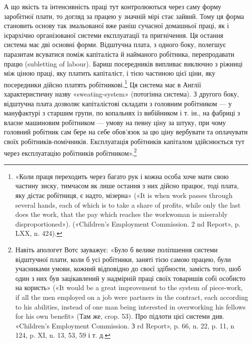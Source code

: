 А що якість та інтенсивність праці тут контролюються через
саму форму заробітної плати, то догляд за працею у значній мірі
стає зайвий. Тому ця форма становить основу так змальованої
вже раніш сучасної домашньої праці, як і ієрархічно організованої
системи експлуатації та пригнічення. Ця остання система
має дві основні форми. Відштучна плата, з одного боку, полегшує
паразитам всуватися поміж капіталіста й найманого робітника,
перепродавати працю (subletting of labour). Бариш посередників
випливає виключно з ріжниці між ціною праці, яку платить
капіталіст, і тією частиною цієї ціни, яку посередники дійсно
платять робітникові.\footnote{
«Коли праця переходить через багато рук і кожна особа хоче
мати свою частину зиску, тимчасом як лише остання з них дійсно працює,
тоді плата, яку дістає робітниця, є надто, мізерна» («It is when work
passes through several hands, each of which is to take a share of profits,
while only the last does the work, that the pay which reaches the workwoman
is miserably disproportioned»). («Children’s Employment Commission.
2 nd Report», p. LXX, n. 424).
} Ця система має в Англії характеристичну
назву «sweating-system» (потогінна система). З другого боку,
відштучна плата дозволяє капіталістові складати з головним робітником
— у мануфактурі з старшим групи, по копальнях із
вибійником і т. ін., на фабриці з власне машиновим робітником —
умову на певну ціну за штуку, при чому головний робітник сам
бере на себе обов’язок за цю ціну вербувати та оплачувати своїх
робітників-помічників. Експлуатація робітників капіталом здійснюється
тут через експлуатацію робітників робітником».\footnote{
Навіть апологет Вотс зауважує: «Було б велике поліпшення
системи відштучної плати, коли б усі робітники, заняті тією самою працею,
були учасниками умови, кожний відповідно до своєї здібности, замість
того, шоб один з них був зацікавлений у надмірній праці своїх
товаришів собі особисто на користь» («It would be a great improvement
to the system of piece-work, if all the men employed on a job were partners
in the contract, each according to his abilities, instead of one man
being interested in overworking his fellows for his own benefit» (Там же,
crop. 53). Про підлоти цієї системи див. «Children’s Employment Commission.
З rd Report», p. 66, n. 22, p. 11, n 124, p. XI, n. 13, 53, 59 і т. д.
}

